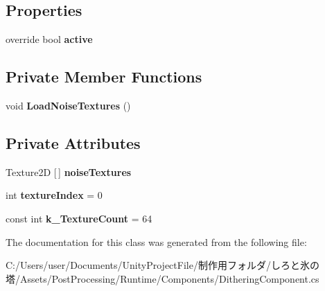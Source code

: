 \subsection*{Properties}
\begin{DoxyCompactItemize}
\item 
\mbox{\label{class_unity_engine_1_1_post_processing_1_1_dithering_component_a53ebd6ecdc65f309abd3d0cf47caecf3}} 
override bool {\bfseries active}
\end{DoxyCompactItemize}
\subsection*{Private Member Functions}
\begin{DoxyCompactItemize}
\item 
\mbox{\label{class_unity_engine_1_1_post_processing_1_1_dithering_component_a918d267dacfe09121d480760594881e4}} 
void {\bfseries Load\+Noise\+Textures} ()
\end{DoxyCompactItemize}
\subsection*{Private Attributes}
\begin{DoxyCompactItemize}
\item 
\mbox{\label{class_unity_engine_1_1_post_processing_1_1_dithering_component_a796f164f2085c62bae2d38d3911b0c5e}} 
Texture2D \mbox{[}$\,$\mbox{]} {\bfseries noise\+Textures}
\item 
\mbox{\label{class_unity_engine_1_1_post_processing_1_1_dithering_component_ad5ec24a359f64662a297eea176288008}} 
int {\bfseries texture\+Index} = 0
\item 
\mbox{\label{class_unity_engine_1_1_post_processing_1_1_dithering_component_acba3d2cdc46933e77d3834d6d8a58ba3}} 
const int {\bfseries k\+\_\+\+Texture\+Count} = 64
\end{DoxyCompactItemize}


The documentation for this class was generated from the following file\+:\begin{DoxyCompactItemize}
\item 
C\+:/\+Users/user/\+Documents/\+Unity\+Project\+File/制作用フォルダ/しろと氷の塔/\+Assets/\+Post\+Processing/\+Runtime/\+Components/Dithering\+Component.\+cs\end{DoxyCompactItemize}
